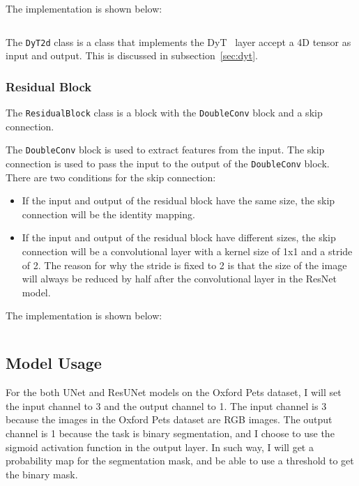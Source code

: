 The implementation is shown below:

\inputminted[firstline=23, highlightlines={35,36,40,41}]{python}{../src/models/common.py}

The \texttt{DyT2d} class is a class that implements the DyT~\cite{DyT} layer accept a 4D tensor as input and output.
This is discussed in subsection~\ref{sec:dyt}.

\subsubsection{Residual Block}
\label{sec:residual_block}

The \texttt{ResidualBlock} class is a block with the \texttt{DoubleConv} block and a skip connection.

The \texttt{DoubleConv} block is used to extract features from the input.
The skip connection is used to pass the input to the output of the \texttt{DoubleConv} block.
There are two conditions for the skip connection:
\begin{itemize}
    \item If the input and output of the residual block have the same size, the skip connection will be the identity mapping.
    \item If the input and output of the residual block have different sizes, the skip connection will be a convolutional layer with a kernel size of 1x1 and a stride of 2.
          The reason for why the stride is fixed to 2 is that the size of the image will always be reduced by half after the convolutional layer in the ResNet~\cite{ResNet} model.
\end{itemize}

The implementation is shown below:

\inputminted[firstline=7, lastline=20]{python}{../src/models/resnet34_unet.py}

\subsection{Model Usage}

For the both UNet and ResUNet models on the Oxford Pets dataset, I will set the input channel to 3 and the output channel to 1.
The input channel is 3 because the images in the Oxford Pets dataset are RGB images.
The output channel is 1 because the task is binary segmentation, and I choose to use the sigmoid activation function in the output layer.
In such way, I will get a probability map for the segmentation mask, and be able to use a threshold to get the binary mask.

